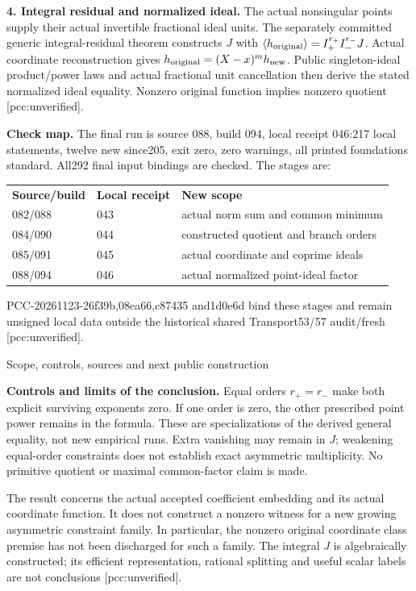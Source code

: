 \documentclass[11pt]{article}
\begin{document}
\textbf{4. Integral residual and normalized ideal.}
The actual nonsingular points supply their actual invertible fractional ideal
units. The separately committed generic integral-residual theorem constructs
\(J\) with
\(\langle h_{\rm original}\rangle=I_+^{r_+}I_-^{r_-}J\).
Actual coordinate reconstruction gives
\(h_{\rm original}=(X-x)^m h_{\rm new}\).
Public singleton-ideal product/power laws and actual fractional unit
cancellation then derive the stated normalized ideal equality. Nonzero original
function implies nonzero quotient [pcc:unverified].

\textbf{Check map.}
The final run is source 088, build 094, local receipt 046:217 local statements,
twelve new since205, exit zero, zero warnings, all printed foundations standard.
All292 final input bindings are checked. The stages are:
\begin{center}\begin{tabular}{lll}
\textbf{Source/build}&\textbf{Local receipt}&\textbf{New scope}\\
082/088&043&actual norm sum and common minimum\\
084/090&044&constructed quotient and branch orders\\
085/091&045&actual coordinate and coprime ideals\\
088/094&046&actual normalized point-ideal factor
\end{tabular}\end{center}
PCC-20261123-26f39b,08ea66,c87435 and1d0e6d bind these stages and remain
unsigned local data outside the historical shared Transport53/57 audit/fresh
[pcc:unverified].
\newpage
\begin{center}{\Large Scope, controls, sources and next public construction}\end{center}
\textbf{Controls and limits of the conclusion.}
Equal orders \(r_+=r_-\) make both explicit surviving exponents zero. If one
order is zero, the other prescribed point power remains in the formula.
These are specializations of the derived general equality, not new empirical
runs. Extra vanishing may remain in \(J\); weakening equal-order constraints
does not establish exact asymmetric multiplicity. No primitive quotient or
maximal common-factor claim is made.

The result concerns the actual accepted coefficient embedding and its actual
coordinate function. It does not construct a nonzero witness for a new growing
asymmetric constraint family. In particular, the nonzero original coordinate
class premise has not been discharged for such a family. The integral \(J\)
is algebraically constructed; its efficient representation, rational splitting
and useful scalar labels are not conclusions [pcc:unverified].
\end{document}
